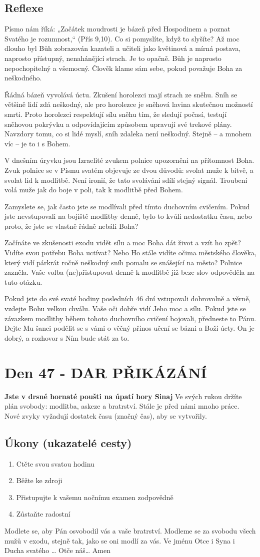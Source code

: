 \documentclass[11pt]{article}
\newcommand{\zacatekSedmyTyden}{
  \textbf{Jste v drsné hornaté poušti na úpatí hory Sinaj} \newline 
  Ve svých rukou držíte plán svobody: modlitba, askeze a bratrství. Stále je před námi mnoho práce. Nové zvyky vyžadují dostatek času (značný čas), aby se vytvořily.

  \subsection*{Úkony (ukazatelé cesty)}
\begin{enumerate}
  \item Ctěte svou svatou hodinu
  \item Běžte ke zdroji
  \item Přistupujte k vašemu nočnímu examen zodpovědně
  \item Zůstaňte radostní
\end{enumerate}
Modlete se, aby Pán osvobodil vás a vaše bratrství. \newline
Modleme se za svobodu všech mužů v exodu, stejně tak, jako se oni modlí za vás.\newline
Ve jménu Otce i Syna i Ducha svatého …  Otče náš… Amen
}
\begin{document}
\subsection*{Reflexe}
Písmo nám říká: „Začátek moudrosti je bázeň před Hospodinem a poznat Svatého je rozumnost,“ (Přís 9,10). Co si pomyslíte, když
to slyšíte? Až moc dlouho byl Bůh zobrazován kazateli a učiteli jako květinová a mírná postava, naprosto přístupný, nenahánějící
strach. Je to opačně. Bůh je naprosto nepochopitelný a všemocný. Člověk klame sám sebe, pokud považuje Boha za neškodného.

Řádná bázeň vyvolává úctu. Zkušení horolezci mají strach ze sněhu. Sníh se většině lidí zdá neškodný, ale pro horolezce je sněhová
lavina skutečnou možností smrti. Proto horolezci respektují sílu sněhu tím, že sledují počasí, testují sněhovou pokrývku a
odpovídajícím způsobem upravují své trekové plány. Navzdory tomu, co si lidé myslí, sníh zdaleka není neškodný. Stejně – a
mnohem víc – je to i s Bohem.

V dnešním úryvku jsou Izraelité zvukem polnice upozorněni na přítomnost Boha. Zvuk polnice se v Písmu svatém objevuje ze dvou
důvodů: svolat muže k bitvě, a svolat lid k modlitbě. Není ironií, že tato svolávání sdílí stejný signál. Troubení volá muže jak do boje
v poli, tak k modlitbě před Bohem.

Zamyslete se, jak často jste se modlívali před tímto duchovním cvičením. Pokud jste nevstupovali na bojiště modlitby denně, bylo
to kvůli nedostatku času, nebo proto, že jste se vlastně řádně nebáli Boha?

Začínáte ve zkušenosti exodu vidět sílu a moc Boha dát život a vzít ho zpět? Vidíte svou potřebu Boha uctívat? Nebo Ho stále vidíte
očima městského člověka, který vidí párkrát ročně neškodný sníh pomalu se snášející na město? Polnice zazněla. Vaše volba
(ne)přistupovat denně k modlitbě již beze slov odpověděla na tuto otázku.

Pokud jste do své svaté hodiny posledních 46 dní vstupovali dobrovolně a věrně, vzdejte Bohu velkou chválu. Vaše oči dobře vidí
Jeho moc a sílu. Pokud jste se závazkem modlitby během tohoto duchovního cvičení bojovali, předneste to Pánu. Dejte Mu šanci
podělit se s vámi o věčný přínos učení se bázni a Boží úcty. On je dobrý, a rozhovor s Ním bude stát za to.


\newpage
\section{Den 47 - DAR PŘIKÁZÁNÍ }
\zacatekSedmyTyden
\end{document}
